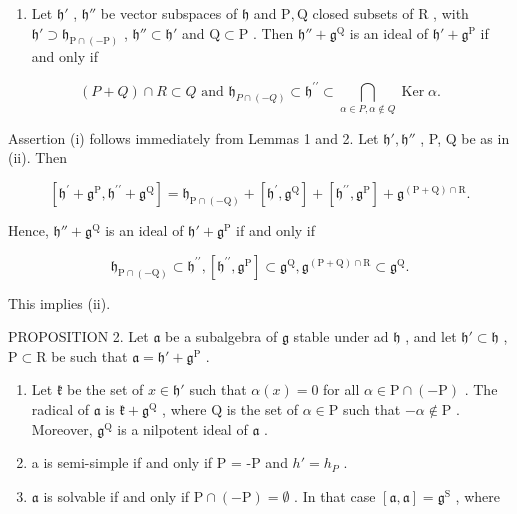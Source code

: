 \begin{enumerate}
\def\labelenumi{(\roman{enumi})}
\setcounter{enumi}{1}
\tightlist
\item
  Let \(\mathfrak{h}'\) , \(\mathfrak{h}''\) be vector subspaces of \(\mathfrak{h}\) and \(\mathrm{P},\mathrm{Q}\) closed subsets of \(\mathrm{R}\) , with \(\mathfrak{h}'\supset \mathfrak{h}_{\mathrm{P}\cap (-\mathrm{P})}\) , \(\mathfrak{h}''\subset \mathfrak{h}'\) and \(\mathrm{Q}\subset \mathrm{P}\) . Then \(\mathfrak{h}'' + \mathfrak{g}^{\mathrm{Q}}\) is an ideal of \(\mathfrak{h}' + \mathfrak{g}^{\mathrm{P}}\) if and only if
\end{enumerate}

\[
(P + Q) \cap R \subset Q \text { and } \mathfrak {h} _ {P \cap (- Q)} \subset \mathfrak {h} ^ {\prime \prime} \subset \bigcap_ {\alpha \in P, \alpha \notin Q} \operatorname{Ker} \alpha .
\]

Assertion (i) follows immediately from Lemmas 1 and 2. Let \(\mathfrak{h}',\mathfrak{h}''\) , P, Q be as in (ii). Then

\[
[ \mathfrak {h} ^ {\prime} + \mathfrak {g} ^ {\mathrm{P}}, \mathfrak {h} ^ {\prime \prime} + \mathfrak {g} ^ {\mathrm{Q}} ] = \mathfrak {h} _ {\mathrm{P} \cap (- \mathrm{Q})} + [ \mathfrak {h} ^ {\prime}, \mathfrak {g} ^ {\mathrm{Q}} ] + [ \mathfrak {h} ^ {\prime \prime}, \mathfrak {g} ^ {\mathrm{P}} ] + \mathfrak {g} ^ {(\mathrm{P} + \mathrm{Q}) \cap \mathrm{R}}.
\]

Hence, \(\mathfrak{h}'' + \mathfrak{g}^{\mathrm{Q}}\) is an ideal of \(\mathfrak{h}' + \mathfrak{g}^{\mathrm{P}}\) if and only if

\[
\mathfrak {h} _ {\mathrm{P} \cap (- \mathrm{Q})} \subset \mathfrak {h} ^ {\prime \prime}, [ \mathfrak {h} ^ {\prime \prime}, \mathfrak {g} ^ {\mathrm{P}} ] \subset \mathfrak {g} ^ {\mathrm{Q}}, \mathfrak {g} ^ {(\mathrm{P} + \mathrm{Q}) \cap \mathrm{R}} \subset \mathfrak {g} ^ {\mathrm{Q}}.
\]

This implies (ii).

PROPOSITION 2. Let \(\mathfrak{a}\) be a subalgebra of \(\mathfrak{g}\) stable under ad \(\mathfrak{h}\) , and let \(\mathfrak{h}' \subset \mathfrak{h}\) , \(\mathrm{P} \subset \mathrm{R}\) be such that \(\mathfrak{a} = \mathfrak{h}' + \mathfrak{g}^{\mathrm{P}}\) .

\begin{enumerate}
\def\labelenumi{(\roman{enumi})}
\item
  Let \(\mathfrak{k}\) be the set of \(x\in \mathfrak{h}'\) such that \(\alpha (x) = 0\) for all \(\alpha \in \mathrm{P}\cap (-\mathrm{P})\) . The radical of \(\mathfrak{a}\) is \(\mathfrak{k} + \mathfrak{g}^{\mathrm{Q}}\) , where \(\mathrm{Q}\) is the set of \(\alpha \in \mathrm{P}\) such that \(-\alpha \notin \mathrm{P}\) . Moreover, \(\mathfrak{g}^{\mathrm{Q}}\) is a nilpotent ideal of \(\mathfrak{a}\) .
\item
  a is semi-simple if and only if P = -P and \(h' = h_{P}\) .
\item
  \(\mathfrak{a}\) is solvable if and only if \(\mathrm{P} \cap (-\mathrm{P}) = \emptyset\) . In that case \([\mathfrak{a}, \mathfrak{a}] = \mathfrak{g}^{\mathrm{S}}\) , where
\end{enumerate}


